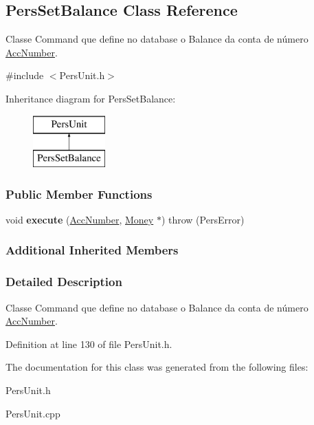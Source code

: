 \hypertarget{classPersSetBalance}{\subsection{Pers\-Set\-Balance Class Reference}
\label{d9/d6f/classPersSetBalance}
}


Classe Command que define no database o Balance da conta de número \hyperlink{classAccNumber}{Acc\-Number}.  




{\ttfamily \#include $<$Pers\-Unit.\-h$>$}

Inheritance diagram for Pers\-Set\-Balance\-:\begin{figure}[H]
\begin{center}
\leavevmode
\includegraphics[height=2.000000cm]{d9/d6f/classPersSetBalance}
\end{center}
\end{figure}
\subsubsection*{Public Member Functions}
\begin{DoxyCompactItemize}
\item 
\hypertarget{classPersSetBalance_ac62b70b221a0e04e9e467f6d9e7162d1}{void {\bfseries execute} (\hyperlink{classAccNumber}{Acc\-Number}, \hyperlink{classMoney}{Money} $\ast$)  throw (\-Pers\-Error)}\label{d9/d6f/classPersSetBalance_ac62b70b221a0e04e9e467f6d9e7162d1}

\end{DoxyCompactItemize}
\subsubsection*{Additional Inherited Members}


\subsubsection{Detailed Description}
Classe Command que define no database o Balance da conta de número \hyperlink{classAccNumber}{Acc\-Number}. 

Definition at line 130 of file Pers\-Unit.\-h.



The documentation for this class was generated from the following files\-:\begin{DoxyCompactItemize}
\item 
Pers\-Unit.\-h\item 
Pers\-Unit.\-cpp\end{DoxyCompactItemize}
